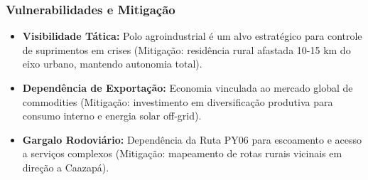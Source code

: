 \subsubsection{Vulnerabilidades e
Mitigação}

\begin{itemize}
\tightlist
\item
  \textbf{Visibilidade Tática:} Polo agroindustrial é um alvo
  estratégico para controle de suprimentos em crises (Mitigação:
  residência rural afastada 10-15 km do eixo urbano, mantendo autonomia
  total).
\item
  \textbf{Dependência de Exportação:} Economia vinculada ao mercado
  global de commodities (Mitigação: investimento em diversificação
  produtiva para consumo interno e energia solar off-grid).
\item
  \textbf{Gargalo Rodoviário:} Dependência da Ruta PY06 para escoamento
  e acesso a serviços complexos (Mitigação: mapeamento de rotas rurais
  vicinais em direção a Caazapá).
\end{itemize}

